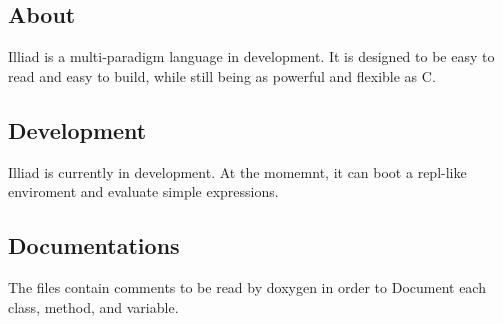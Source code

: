 \subsection*{About}

Illiad is a multi-\/paradigm language in development. It is designed to be easy to read and easy to build, while still being as powerful and flexible as C.

\subsection*{Development}

Illiad is currently in development. At the momemnt, it can boot a repl-\/like enviroment and evaluate simple expressions.

\subsection*{Documentations}

The files contain comments to be read by doxygen in order to Document each class, method, and variable. 
